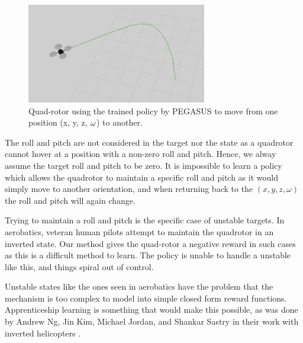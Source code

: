 \documentclass[BTech]{iitmdiss}
\begin{document}
\begin{figure}[h]
  \centering
    \includegraphics[width=0.7\textwidth]{quadrotor_position_control.png}
    \caption{Quad-rotor using the trained policy by PEGASUS to move from one position (x, y, z, $\protect\omega$) to another.}
\end{figure}

The roll and pitch are not considered in the target nor the state as a quadrotor cannot hover at a position with a non-zero roll and pitch. Hence, we alway assume the target roll and pitch to be zero. It is impossible to learn a policy which allows the quadrotor to maintain a specific roll and pitch as it would simply move to another orientation, and when returning back to the $(x, y, z, \omega)$ the roll and pitch will again change.

Trying to maintain a roll and pitch is the specific case of unstable targets. In aerobatics, veteran human pilots attempt to maintain the quadrotor in an inverted state. Our method gives the quad-rotor a negative reward in such cases as this is a difficult method to learn. The policy is unable to handle a unstable like this, and things spiral out of control.

Unstable states like the ones seen in aerobatics have the problem that the mechanism is too complex to model into simple closed form reward functions. Apprenticeship learning is something that would make this possible, as was done by Andrew Ng, Jin Kim, Michael Jordan, and Shankar Sastry in their work with inverted helicopters \cite{InvertedHelicopterFlight}.
\end{document}
